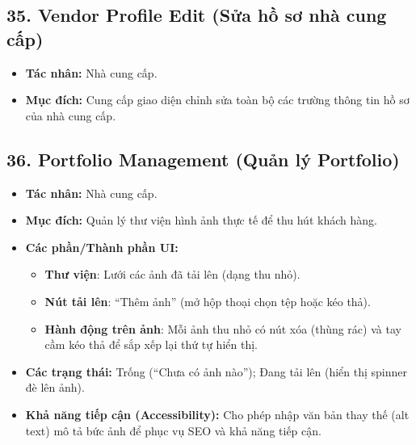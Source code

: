 \documentclass[11pt,a4paper]{article}
\begin{document}
\subsection{35. Vendor Profile Edit (Sửa hồ sơ nhà cung cấp)}
\begin{itemize}
    \item \textbf{Tác nhân:} Nhà cung cấp.
    \item \textbf{Mục đích:} Cung cấp giao diện chỉnh sửa toàn bộ các trường thông tin hồ sơ của nhà cung cấp.
\end{itemize}

\subsection{36. Portfolio Management (Quản lý Portfolio)}
\begin{itemize}
    \item \textbf{Tác nhân:} Nhà cung cấp.
    \item \textbf{Mục đích:} Quản lý thư viện hình ảnh thực tế để thu hút khách hàng.
    \item \textbf{Các phần/Thành phần UI:}
    \begin{itemize}
        \item \textbf{Thư viện}: Lưới các ảnh đã tải lên (dạng thu nhỏ).
        \item \textbf{Nút tải lên}: ``Thêm ảnh'' (mở hộp thoại chọn tệp hoặc kéo thả).
        \item \textbf{Hành động trên ảnh}: Mỗi ảnh thu nhỏ có nút xóa (thùng rác) và tay cầm kéo thả để sắp xếp lại thứ tự hiển thị.
    \end{itemize}
    \item \textbf{Các trạng thái:} Trống (``Chưa có ảnh nào''); Đang tải lên (hiển thị spinner đè lên ảnh).
    \item \textbf{Khả năng tiếp cận (Accessibility):} Cho phép nhập văn bản thay thế (alt text) mô tả bức ảnh để phục vụ SEO và khả năng tiếp cận.
\end{itemize}
\end{document}
